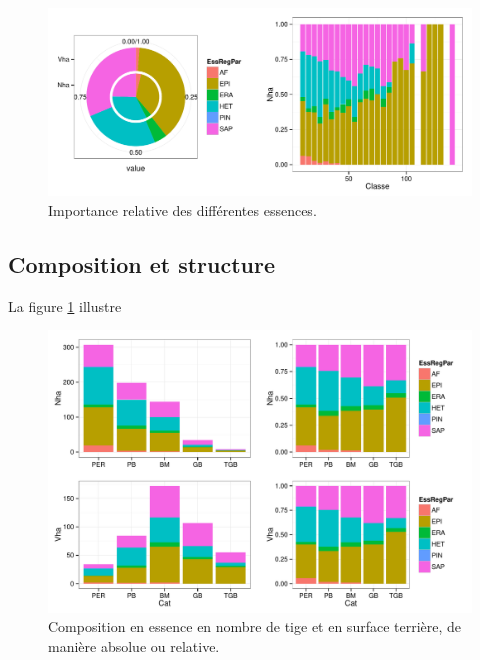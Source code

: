 \documentclass[a4paper]{book}\usepackage[]{graphicx}\usepackage[]{color}
\makeatletter
\def\maxwidth{ %
  \ifdim\Gin@nat@width>\linewidth
    \linewidth
  \else
    \Gin@nat@width
  \fi
}
\newenvironment{knitrout}{}{} %
\makeatother
\begin{document}
\begin{knitrout}
\color{fgcolor}\begin{figure}[htdp]


{\centering \includegraphics[width=\maxwidth]{Figures/Compo-1} 

}

\caption[Importance relative des différentes essences]{Importance relative des différentes essences.\label{fig:Compo}}
\end{figure}


\end{knitrout}


\subsection{Composition et structure}
La figure \ref{fig:Compo} illustre
\begin{knitrout}
\color{fgcolor}\begin{figure}[h]


{\centering \includegraphics[width=\maxwidth]{Figures/CompoNG-1} 

}

\caption[Composition en essence en nombre de tige et en surface terrière, de manière absolue ou relative]{Composition en essence en nombre de tige et en surface terrière, de manière absolue ou relative.\label{fig:CompoNG}}
\end{figure}


\end{knitrout}
\end{document}
